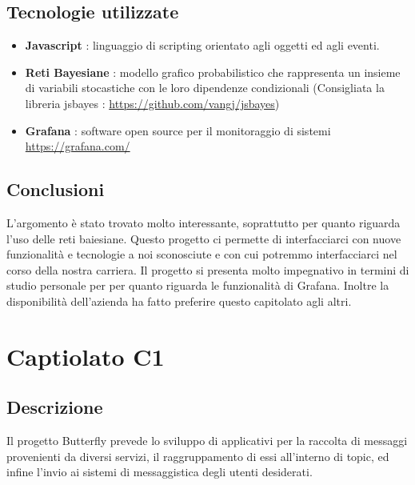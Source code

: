 \documentclass{article}
\begin{document}
        \subsection{Tecnologie utilizzate}
            \begin{itemize}
                \item \textbf{Javascript} : linguaggio di scripting orientato agli oggetti ed agli eventi.
                    \item \textbf{Reti Bayesiane} : modello grafico probabilistico che rappresenta un insieme di variabili stocastiche con le loro dipendenze condizionali (Consigliata la libreria jsbayes : \url{https://github.com/vangj/jsbayes})
                    \item \textbf{Grafana} : software open source per il monitoraggio di sistemi \url{https://grafana.com/}
            \end{itemize}
         \subsection{Conclusioni}
            L'argomento è stato trovato molto interessante, soprattutto per quanto riguarda l'uso delle reti baiesiane. Questo progetto ci permette di interfacciarci con nuove funzionalità e tecnologie a noi sconosciute e con cui potremmo interfacciarci nel corso della nostra carriera.
            Il progetto si presenta molto impegnativo in termini di studio personale per per quanto riguarda le funzionalità di Grafana.
            Inoltre la disponibilità dell'azienda ha fatto preferire questo capitolato agli altri.
\newpage

	\section{Captiolato C1}
        \subsection{Descrizione}
            Il progetto Butterfly prevede lo sviluppo di applicativi per la raccolta di messaggi provenienti da diversi servizi, il raggruppamento di essi all'interno di topic, ed infine l'invio ai sistemi di messaggistica degli utenti desiderati.
\end{document}
